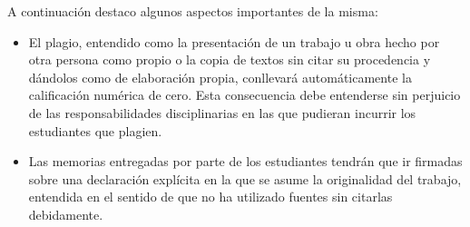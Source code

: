 A continuación destaco algunos aspectos importantes de la misma:
\begin{itemize}
    \item El plagio, entendido como la presentación de un trabajo u obra hecho por otra persona como propio o la copia de textos sin citar su procedencia y dándolos como de elaboración propia, conllevará automáticamente la calificación numérica de cero. Esta consecuencia debe entenderse sin perjuicio de las responsabilidades disciplinarias en las que pudieran incurrir los estudiantes que plagien.
    \item Las memorias entregadas por parte de los estudiantes tendrán que ir firmadas sobre una declaración explícita en la que se asume la originalidad del trabajo, entendida en el sentido de que no ha utilizado fuentes sin citarlas debidamente.
\end{itemize}








